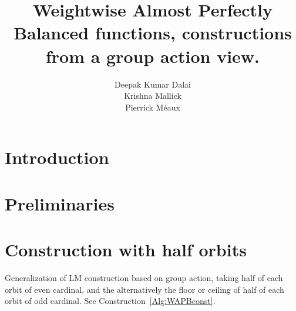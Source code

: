 \documentclass{llncs}
\begin{document}
	\title{Weightwise Almost Perfectly Balanced functions, constructions from a group action view.}
		

\ifnum{}
\author{
	Deepak Kumar Dalai\\
	Krishna Mallick\\
	Pierrick M\'eaux
}


\fi
	

	
	\maketitle


\setcounter{page}{1}	

\begin{abstract}
 	\end{abstract}
 
 
\section{Introduction} 
\section{Preliminaries}

	
	

\section{Construction with half orbits}\label{sec:half}

Generalization of LM construction based on group action, taking half of each orbit of even cardinal, and the alternatively the floor or ceiling of half of each orbit of odd cardinal. See Construction~\ref{Alg:WAPBconst}.
\end{document}
